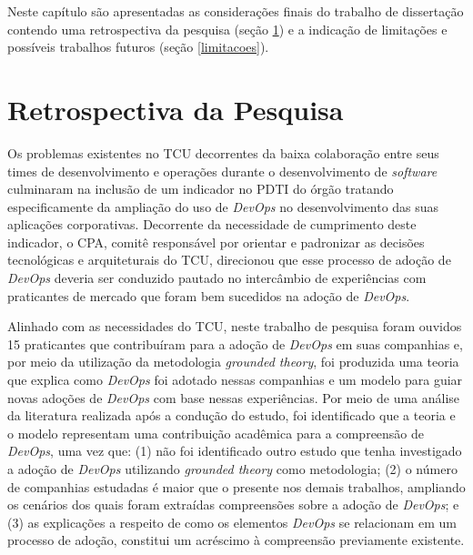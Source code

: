 Neste capítulo são apresentadas as considerações finais do trabalho de
dissertação contendo uma retrospectiva da pesquisa (seção \ref{secao_retro}) e
a indicação de limitações e possíveis trabalhos futuros (seção \ref{limitacoes}).

\section{Retrospectiva da Pesquisa}\label{secao_retro}

Os problemas existentes no \acrshort{TCU} decorrentes da baixa colaboração entre
seus times de desenvolvimento e operações durante o desenvolvimento de {\it software}
culminaram na inclusão de um indicador no \acrshort{PDTI} do órgão
tratando especificamente da ampliação do uso de {\it DevOps} no desenvolvimento
das suas aplicações corporativas. Decorrente da necessidade de cumprimento deste
indicador, o \acrshort{CPA}, comitê responsável por orientar e padronizar as
decisões tecnológicas e arquiteturais do \acrshort{TCU}, direcionou que esse
processo de adoção de {\it DevOps} deveria ser conduzido pautado no intercâmbio
de experiências com praticantes de mercado que foram bem sucedidos na adoção de
{\it DevOps}.

Alinhado com as necessidades do \acrshort{TCU}, neste trabalho de pesquisa foram
ouvidos 15 praticantes que contribuíram para a adoção de {\it DevOps} em suas
companhias e, por meio da utilização da metodologia {\it grounded theory}, foi
produzida uma teoria que explica como {\it DevOps} foi adotado nessas companhias
e um modelo para guiar novas adoções de {\it DevOps} com base nessas
experiências. Por meio de uma análise da literatura realizada após a condução
do estudo, foi identificado que a teoria e o modelo representam uma contribuição
acadêmica para a compreensão de {\it DevOps}, uma vez que: (1) não foi
identificado outro estudo que tenha investigado a adoção de {\it DevOps}
utilizando {\it grounded theory} como metodologia; (2) o número de companhias
estudadas é maior que o presente nos demais trabalhos, ampliando os cenários
dos quais foram extraídas compreensões sobre a adoção de {\it DevOps}; e (3) as
explicações a respeito de como os elementos {\it DevOps} se relacionam em um
processo de adoção, constitui um acréscimo à compreensão previamente existente.

